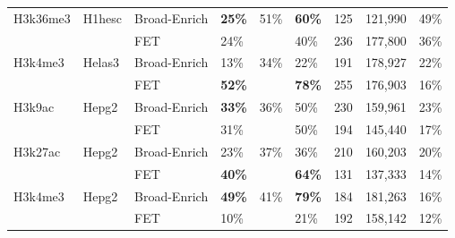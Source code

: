 \begin{sidewaystable}[!ht]
\begin{tabular}{lll|p{1.5cm}p{1.5cm}p{1.5cm}p{1.5cm}p{1.5cm}p{1.5cm}}
H3k36me3     & H1hesc             & Broad-Enrich    & \textbf{25\%}                 & 51\%                          & \textbf{60\%}                    & 125                      & 121,990                & 49\%                     \\
             &                    & FET             & 24\%                          &                               & 40\%                             & 236                      & 177,800                & 36\%                     \\
H3k4me3      & Helas3             & Broad-Enrich    & 13\%                          & 34\%                          & 22\%                             & 191                      & 178,927                & 22\%                     \\
             &                    & FET             & \textbf{52\%}                 &                               & \textbf{78\%}                    & 255                      & 176,903                & 16\%                     \\
H3k9ac       & Hepg2              & Broad-Enrich    & \textbf{33\%}                 & 36\%                          & 50\%                             & 230                      & 159,961                & 23\%                     \\
             &                    & FET             & 31\%                          &                               & 50\%                             & 194                      & 145,440                & 17\%                     \\
H3k27ac      & Hepg2              & Broad-Enrich    & 23\%                          & 37\%                          & 36\%                             & 210                      & 160,203                & 20\%                     \\
             &                    & FET             & \textbf{40\%}                 &                               & \textbf{64\%}                    & 131                      & 137,333                & 14\%                     \\
H3k4me3      & Hepg2              & Broad-Enrich    & \textbf{49\%}                 & 41\%                          & \textbf{79\%}                    & 184                      & 181,263                & 16\%                     \\
             &                    & FET             & 10\%                          &                               & 21\%                             & 192                      & 158,142                & 12\%                     \\

\end{tabular}
\end{sidewaystable}
